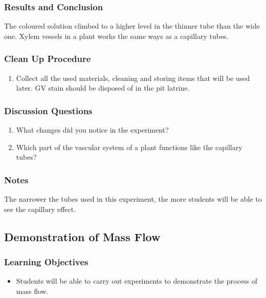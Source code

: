 \subsubsection*{Results and Conclusion}
The coloured solution climbed to a higher level in the thinner tube than the wide one. Xylem vessels in a plant works the same ways as a capillary tubes.

\subsubsection*{Clean Up Procedure}
\begin{enumerate}
\item{Collect all the used materials, cleaning and storing items that will be used later. GV stain should be disposed of in the pit latrine.}
\end{enumerate}

\subsubsection*{Discussion Questions}
\begin{enumerate}
\item{What changes did you notice in the experiment?}
\item{Which part of the vascular system of a plant functions like the capillary tubes?}
\end{enumerate}

\subsubsection*{Notes}
The narrower the tubes used in this experiment, the more students will be able to see the capillary effect.

\subsection{Demonstration of Mass Flow}

\subsubsection*{Learning Objectives}
\begin{itemize}
\item{Students will be able to carry out experiments to demonstrate the process of mass flow.}
\end{itemize}

